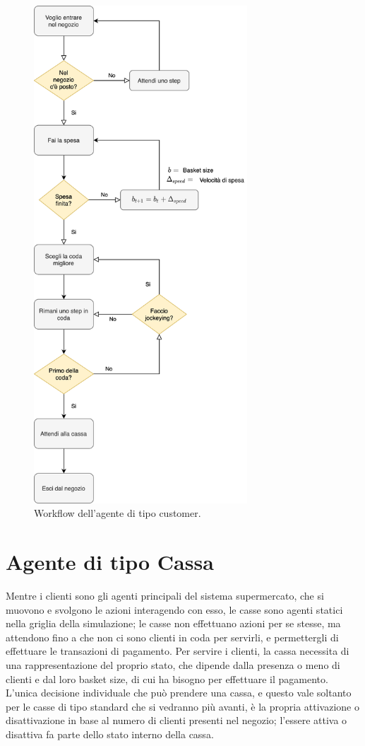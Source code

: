\begin{figure}[H]
	\centering
	\includegraphics[width=8cm]{"images/workflow_customer.png"}
	\caption{Workflow dell'agente di tipo customer.}
	\label{fig:workflow_customer}
\end{figure}

\section{Agente di tipo Cassa}
\label{model:cashdesks}

Mentre i clienti sono gli agenti principali del sistema supermercato, che si muovono e svolgono le azioni interagendo con esso, le casse sono agenti statici nella griglia della simulazione; le casse non effettuano azioni per se stesse, ma attendono fino a che non ci sono clienti in coda per servirli, e permettergli di effettuare le transazioni di pagamento. Per servire i clienti, la cassa necessita di una rappresentazione del proprio stato, che dipende dalla presenza o meno di clienti e dal loro basket size, di cui ha bisogno per effettuare il pagamento. L'unica decisione individuale che può prendere una cassa, e questo vale soltanto per le casse di tipo standard che si vedranno più avanti, è la propria attivazione o disattivazione in base al numero di clienti presenti nel negozio; l'essere attiva o disattiva fa parte dello stato interno della cassa.

